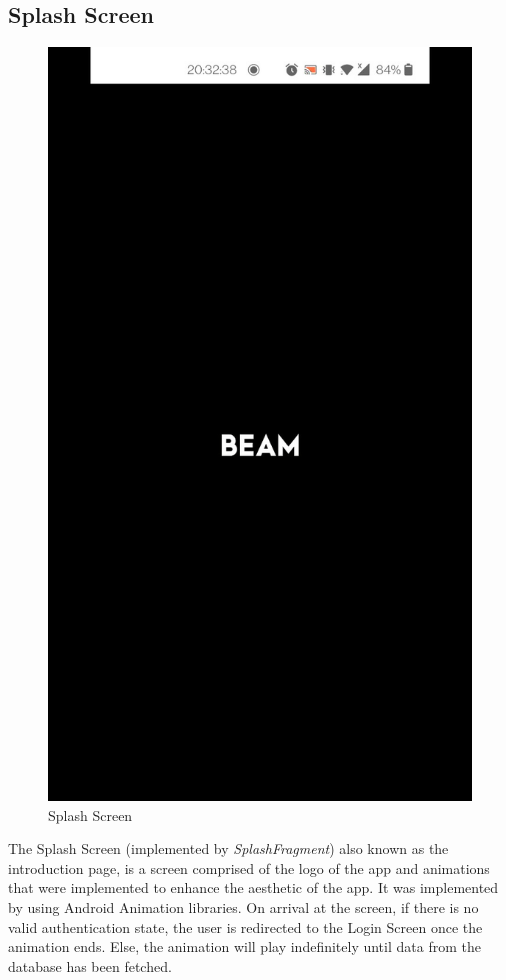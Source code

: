 \documentclass[../report.tex]{subfiles}
\begin{document}
\subsection{Splash Screen}
\begin{figure}[H]
	\centering
	\includegraphics[width=.28\linewidth]{../images/07/02-app-splash.jpg}
	\caption{Splash Screen}
	\label{fig:app-splash-screen}
\end{figure}
The Splash Screen (implemented by \textit{SplashFragment}) also known as the introduction page, is a screen comprised of the logo of the app and animations that were implemented to enhance the aesthetic of the app. It was implemented by using Android Animation libraries. On arrival at the screen, if there is no valid authentication state, the user is redirected to the Login Screen once the animation ends. Else, the animation will play indefinitely until data from the database has been fetched.
\end{document}
